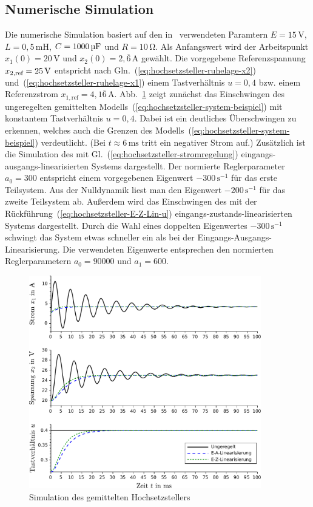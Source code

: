 \subsection{Numerische Simulation\label{subsec:Hochsetzsteller-Num-Sim}}

Die numerische Simulation basiert auf den in~\cite[Abschnitt~{8.6.1}]{bacha2014}
verwendeten Paramtern $E=15\,\textrm{V}$, $L=0,5\,\textrm{mH}$,
$C=1000\,\textrm{\textmu F}$ und $R=10\,\mathrm{\Omega}$. Als Anfangswert
wird der Arbeitspunkt $x_{1}(0)=20\,\text{V}$ und $x_{2}(0)=2,\overline{6}\,\text{A}$
gewählt. Die vorgegebene Referenzspannung $x_{2,\text{ref}}=25\,\mbox{\textrm{V}}$
entspricht nach Gln.~(\ref{eq:hochsetzsteller-ruhelage-x2}) und~(\ref{eq:hochsetzsteller-ruhelage-x1})
einem Tastverhältnis $u=0,4$ bzw. einem Referenz\-strom $x_{1,\text{ref}}=4,1\bar{6}\,\textrm{A}$.
Abb.~\ref{fig:Simulation-Hochsetzsteller} zeigt zunächst das Einschwingen
des ungeregelten gemittelten Modells~(\ref{eq:hochsetzsteller-system-beispiel})
mit konstantem Tastverhältnis $u=0,4$. Dabei ist ein deutliches Überschwingen
zu erkennen, welches auch die Grenzen des Modells~(\ref{eq:hochsetzsteller-system-beispiel})
verdeutlicht. (Bei $t\approx6\,\text{ms}$ tritt ein negativer Strom
auf.) Zusätz\-lich ist die Simulation des mit Gl.~(\ref{eq:hochsetzsteller-stromregelung})
eingangs-ausgangs-linearisierten Systems dargestellt. Der normierte
Reglerparameter $a_{0}=300$ entspricht einem vorgegebenen Eigenwert
$-300\,\text{s}^{-1}$ für das erste Teilsystem. Aus der Nulldynamik
liest man den Eigenwert $-200\,\text{s}^{-1}$ für das zweite Teilsystem
ab. Außerdem wird das Einschwingen des mit der Rückführung~(\ref{eq:hochsetzsteller-E-Z-Lin-u})
eingangs-zustands-linearisierten Systems dargestellt. Durch die Wahl
eines doppelten Eigenwertes $-300\,\text{s}^{-1}$ schwingt das System
etwas schneller ein als bei der Eingangs-Ausgangs-Linearisierung.
Die verwendeten Eigenwerte entsprechen den normierten Reglerparametern
$a_{0}=90000$ und $a_{1}=600$.

\begin{figure}
\begin{centering}
\includegraphics[width=0.9\textwidth]{Hochsetzsteller_Simulation}
\par\end{centering}
\caption{Simulation des gemittelten Hochsetzstellers\label{fig:Simulation-Hochsetzsteller}}
\end{figure}




